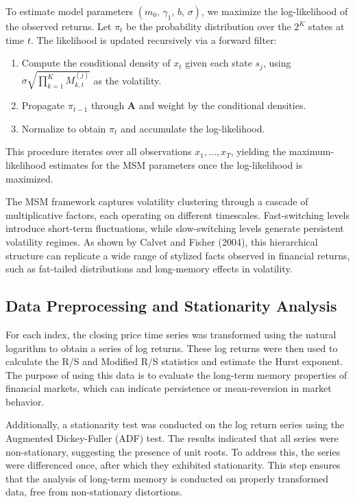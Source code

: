 \documentclass[11pt]{extarticle}
\begin{document}
To estimate model parameters $(m_0,\,\gamma_1,\,b,\,\sigma)$, we maximize the log-likelihood of the observed returns. Let $\pi_t$ be the probability distribution over the $2^K$ states at time $t$. The likelihood is updated recursively via a forward filter:
\begin{enumerate}
    \item Compute the conditional density of $x_t$ given each state $s_j$,
          using $\sigma \sqrt{\prod_{k=1}^K M_{k,t}^{(j)}}$ as the volatility.
    \item Propagate $\pi_{t-1}$ through $\mathbf{A}$ and weight by the conditional densities.
    \item Normalize to obtain $\pi_t$ and accumulate the log-likelihood.
\end{enumerate}
This procedure iterates over all observations $x_1,\ldots,x_T$, yielding the maximum-likelihood estimates for the MSM parameters once the log-likelihood is maximized.

The MSM framework captures volatility clustering through a cascade of multiplicative factors, each operating on different timescales. Fast-switching levels introduce short-term fluctuations, while slow-switching levels generate persistent volatility regimes. As shown by Calvet and Fisher (2004), this hierarchical structure can replicate a wide range of stylized facts observed in financial returns, such as fat-tailed distributions and long-memory effects in volatility.

\subsection{Data Preprocessing and Stationarity Analysis}
For each index, the closing price time series was transformed using the natural logarithm to obtain a series of log returns.
These log returns were then used to calculate the R/S and Modified R/S statistics and estimate the Hurst exponent.
The purpose of using this data is to evaluate the long-term memory properties of financial markets, which can indicate persistence or mean-reversion in market behavior.

Additionally, a stationarity test was conducted on the log return series using the Augmented Dickey-Fuller (ADF) test.
The results indicated that all series were non-stationary, suggesting the presence of unit roots. To address this, the series were differenced once, after which they exhibited stationarity.
This step ensures that the analysis of long-term memory is conducted on properly transformed data, free from non-stationary distortions.
\end{document}
